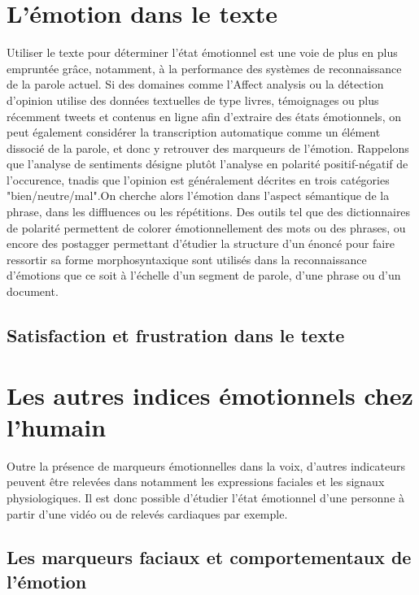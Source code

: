 \section{L'émotion dans le texte}
Utiliser le texte pour déterminer l'état émotionnel est une voie de plus en plus empruntée grâce, notamment, à la performance des systèmes de reconnaissance de la parole actuel.
Si des domaines comme l'Affect analysis ou la détection d'opinion utilise des données textuelles de type livres, témoignages ou plus récemment tweets et contenus en ligne afin d'extraire des états émotionnels, on peut également considérer la transcription automatique comme un élément dissocié de la parole, et donc y retrouver des marqueurs de l'émotion. Rappelons que l’analyse de sentiments désigne plutôt l’analyse en polarité positif-négatif de l'occurence, tnadis que l'opinion est généralement décrites en trois catégories "bien/neutre/mal".On cherche alors l'émotion dans l'aspect sémantique de la phrase, dans les diffluences ou les répétitions.
Des outils tel que des dictionnaires de polarité permettent de colorer émotionnellement des mots ou des phrases, ou encore des postagger permettant d'étudier la structure d'un énoncé pour faire ressortir sa forme morphosyntaxique sont utilisés dans la reconnaissance d'émotions que ce soit à l'échelle d'un segment de parole, d'une phrase ou d'un document.

\subsection{Satisfaction et frustration dans le texte}

\section{Les autres indices émotionnels chez l'humain}
Outre la présence de marqueurs émotionnelles dans la voix, d'autres indicateurs peuvent être relevées dans notamment les expressions faciales et les signaux physiologiques. Il est donc possible d'étudier l'état émotionnel d'une personne à partir d'une vidéo ou de relevés cardiaques par exemple.

\subsection{Les marqueurs faciaux et comportementaux de l'émotion}

